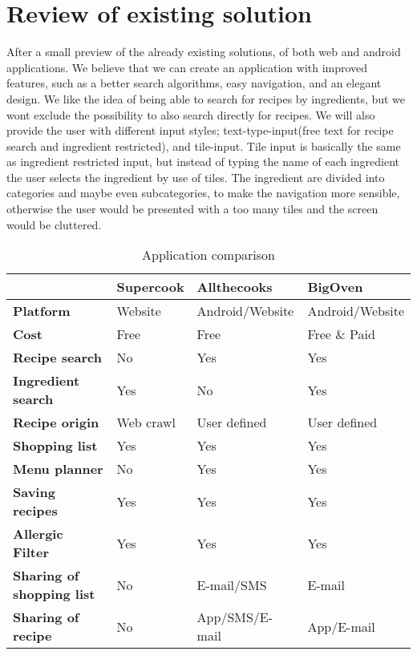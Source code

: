 \section{Review of existing solution}
After a small preview of the already existing solutions, of both web and android applications. We believe that we can create an application with improved features, such as a better search algorithms, easy navigation, and an elegant design. We like the idea of being able to search for recipes by ingredients, but we wont exclude the possibility to also search directly for recipes. We will also provide the user with different input styles; text-type-input(free text for recipe search and ingredient restricted), and tile-input. Tile input is basically the same as ingredient restricted input, but instead of typing the name of each ingredient the user selects the ingredient by use of tiles. The ingredient are divided into categories and maybe even subcategories, to make the navigation more sensible, otherwise the user would be presented with a too many tiles and the screen would be cluttered.

\begin{table}[H]
\centering
\begin{tabular}{|l|l|l|l|}
\hline
 & \textbf{Supercook} & \textbf{Allthecooks} & \textbf{BigOven} \\
\hline
\textbf{Platform} & Website & Android/Website & Android/Website \\
\hline
\textbf{Cost} & Free & Free & Free \& Paid \\
\hline
\textbf{Recipe search} & No & Yes & Yes  \\
\hline
\textbf{Ingredient search} & Yes & No & Yes \\
\hline
\textbf{Recipe origin} & Web crawl & User defined & User defined \\
\hline
\textbf{Shopping list} & Yes & Yes & Yes \\
\hline
\textbf{Menu planner} & No & Yes & Yes \\
\hline
\textbf{Saving recipes} & Yes & Yes & Yes \\
\hline
\textbf{Allergic Filter} & Yes & Yes & Yes \\
\hline
\textbf{Sharing of shopping list} & No & E-mail/SMS & E-mail \\
\hline
\textbf{Sharing of recipe} & No & App/SMS/E-mail & App/E-mail \\
\hline
\end{tabular}
\caption{Application comparison}
\label{tab:appcomparison}
\end{table}

